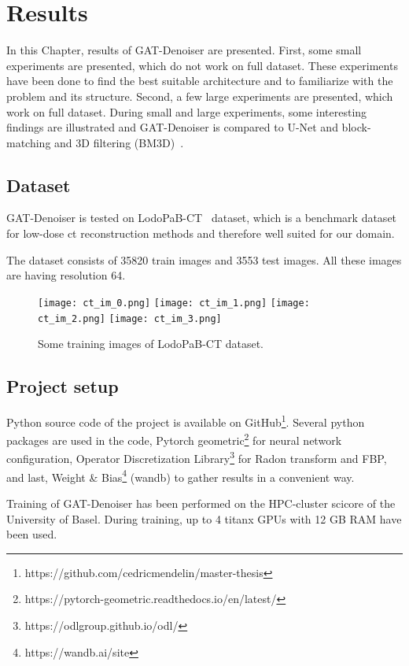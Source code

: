 \chapter{Results}
\label{sec:results}

In this Chapter, results of GAT-Denoiser are presented.
First, some small experiments are presented, which do not work on full dataset.
These experiments have been done to find the best suitable architecture and to 
familiarize with the problem and its structure.
Second, a few large experiments are presented, which work on full dataset.
During small and large experiments, some interesting findings are illustrated and GAT-Denoiser
is compared to U-Net and block-matching and 3D filtering (BM3D)~\cite{bm3d}.


\section{Dataset}
GAT-Denoiser is tested on LodoPaB-CT~\cite{lodopab-dataset} dataset, which is a 
benchmark dataset for low-dose ct reconstruction methods and therefore well suited for our domain.

The dataset consists of 35820 train images and 3553 test images.
All these images are having resolution 64.

\begin{figure}[H]
  \centering
  \hfill
  \texttt{[image: ct\_im\_0.png]}
  \hfill
  \texttt{[image: ct\_im\_1.png]}
  \hfill
  \texttt{[image: ct\_im\_2.png]}
  \hfill
  \texttt{[image: ct\_im\_3.png]}
  \hfill
  \caption{Some training images of LodoPaB-CT dataset.}
\end{figure}



\section{Project setup}
Python source code of the project is available on GitHub\footnote{https://github.com/cedricmendelin/master-thesis}.
Several python packages are used in the code, Pytorch geometric\footnote{https://pytorch-geometric.readthedocs.io/en/latest/} 
for neural network configuration, Operator Discretization Library\footnote{https://odlgroup.github.io/odl/} for Radon transform and FBP, 
and last, Weight \& Bias\footnote{https://wandb.ai/site} (wandb) to gather results in a convenient way.

Training of GAT-Denoiser has been performed on the HPC-cluster scicore of the University of Basel.
During training, up to 4 titanx GPUs with 12 GB RAM have been used.


